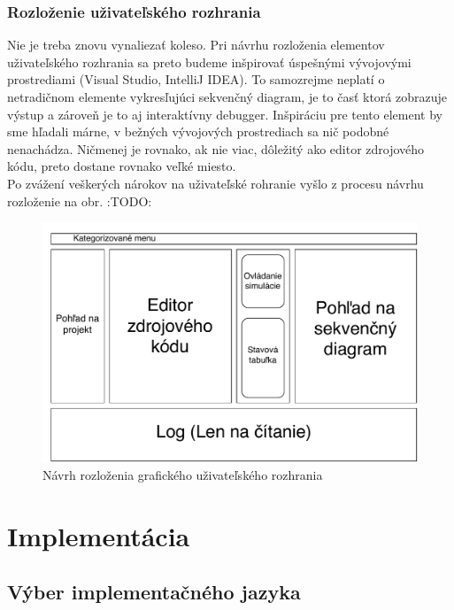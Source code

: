 \subsection{Rozloženie uživateľského rozhrania}

Nie je treba znovu vynaliezať koleso. Pri návrhu rozloženia elementov uživateľského rozhrania sa preto budeme inšpirovať úspešnými vývojovými prostrediami (Visual Studio, IntelliJ IDEA).
To samozrejme neplatí o netradičnom elemente vykresľujúci sekvenčný diagram, je to časť ktorá zobrazuje výstup a zároveň je to aj interaktívny debugger. Inšpiráciu pre tento element by sme hľadali márne, v bežných vývojových prostrediach sa nič podobné nenachádza.
Ničmenej je rovnako, ak nie viac, dôležitý ako editor zdrojového kódu, preto dostane rovnako veľké miesto. \\

Po zvážení veškerých nárokov na uživateľské rohranie vyšlo z procesu návrhu rozloženie na obr. :TODO:

\begin{figure}[H]
	\label{fig:ui-layout}
	\centering
	\includegraphics[scale=0.75]{obrazky-figures/UI-layout}
	\caption{Návrh rozloženia grafického uživateľského rozhrania}
\end{figure}



\chapter{Implementácia}

\section{Výber implementačného jazyka}

